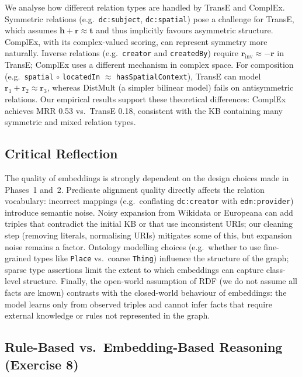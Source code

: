 \documentclass[11pt,a4paper]{article}
\begin{document}
  We analyse how different relation types are handled by TransE and ComplEx. Symmetric relations (e.g.\ \texttt{dc:subject}, \texttt{dc:spatial}) pose a challenge for TransE, which assumes $\mathbf{h}+\mathbf{r} \approx \mathbf{t}$ and thus implicitly favours asymmetric structure. ComplEx, with its complex-valued scoring, can represent symmetry more naturally. Inverse relations (e.g.\ \texttt{creator} and \texttt{createdBy}) require $\mathbf{r}_{\mathrm{inv}} \approx -\mathbf{r}$ in TransE; ComplEx uses a different mechanism in complex space. For composition (e.g.\ \texttt{spatial} $\circ$ \texttt{locatedIn} $\approx$ \texttt{hasSpatialContext}), TransE can model $\mathbf{r}_1 + \mathbf{r}_2 \approx \mathbf{r}_3$, whereas DistMult (a simpler bilinear model) fails on antisymmetric relations. Our empirical results support these theoretical differences: ComplEx achieves MRR 0.53 vs.\ TransE 0.18, consistent with the KB containing many symmetric and mixed relation types.

  \subsection{Critical Reflection}

  The quality of embeddings is strongly dependent on the design choices made in Phases~1 and~2. Predicate alignment quality directly affects the relation vocabulary: incorrect mappings (e.g.\ conflating \texttt{dc:creator} with \texttt{edm:provider}) introduce semantic noise. Noisy expansion from Wikidata or Europeana can add triples that contradict the initial KB or that use inconsistent URIs; our cleaning step (removing literals, normalising URIs) mitigates some of this, but expansion noise remains a factor. Ontology modelling choices (e.g.\ whether to use fine-grained types like \texttt{Place} vs.\ coarse \texttt{Thing}) influence the structure of the graph; sparse type assertions limit the extent to which embeddings can capture class-level structure. Finally, the open-world assumption of RDF (we do not assume all facts are known) contrasts with the closed-world behaviour of embeddings: the model learns only from observed triples and cannot infer facts that require external knowledge or rules not represented in the graph.

  \subsection{Rule-Based vs.\ Embedding-Based Reasoning (Exercise 8)}
\end{document}
